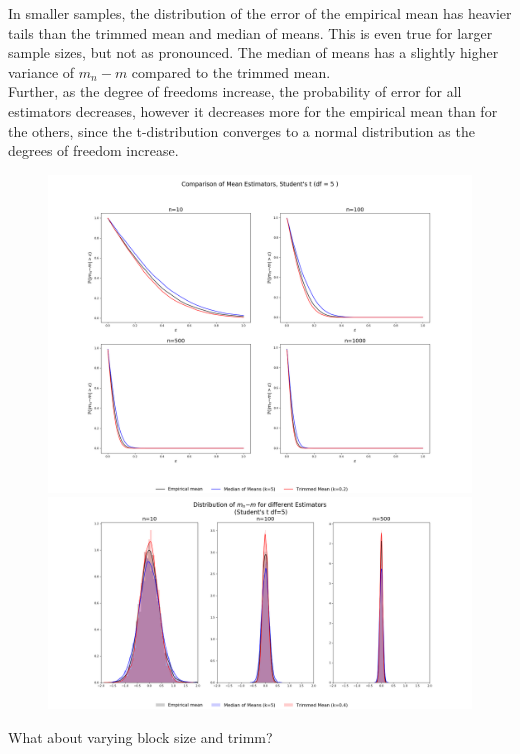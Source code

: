 \documentclass[a4paper, 11pt]{article} %
\begin{document}
In smaller samples, the distribution of the error of the empirical mean has heavier tails than the trimmed mean and median of means. This is even true for larger sample sizes, but not as pronounced. The median of means has a slightly higher variance of $m_n -m$ compared to the trimmed mean. \\

Further, as the degree of freedoms increase, the probability of error for all estimators decreases, however it decreases more for the empirical mean than for the others, since the t-distribution converges to a normal distribution as the degrees of freedom increase.

\begin{figure}[H]
\centering
\includegraphics[scale=0.29]{Students_5df}
\includegraphics[scale=0.29]{Studentsdf5_Dist_k5}
\end{figure}

What about varying block size and trimm?
\end{document}
